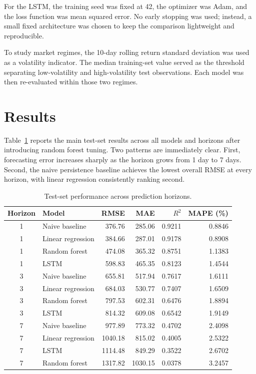 \documentclass[conference]{IEEEtran}
\begin{document}
For the LSTM, the training seed was fixed at 42, the optimizer was Adam, and the loss function was mean squared error. No early stopping was used; instead, a small fixed architecture was chosen to keep the comparison lightweight and reproducible.

To study market regimes, the 10-day rolling return standard deviation was used as a volatility indicator. The median training-set value served as the threshold separating low-volatility and high-volatility test observations. Each model was then re-evaluated within those two regimes.

\section{Results}
Table~\ref{tab:testmetrics} reports the main test-set results across all models and horizons after introducing random forest tuning. Two patterns are immediately clear. First, forecasting error increases sharply as the horizon grows from 1 day to 7 days. Second, the naive persistence baseline achieves the lowest overall RMSE at every horizon, with linear regression consistently ranking second.

\begin{table}[t]
\centering
\caption{Test-set performance across prediction horizons.}
\label{tab:testmetrics}
\scriptsize
\begin{tabular}{c l r r r r}
\toprule
Horizon & Model & RMSE & MAE & $R^2$ & MAPE (\%) \\
\midrule
1 & Naive baseline & 376.76 & 285.06 & 0.9211 & 0.8846 \\
1 & Linear regression & 384.66 & 287.01 & 0.9178 & 0.8908 \\
1 & Random forest & 474.08 & 365.32 & 0.8751 & 1.1383 \\
1 & LSTM & 598.83 & 465.35 & 0.8123 & 1.4544 \\
\midrule
3 & Naive baseline & 655.81 & 517.94 & 0.7617 & 1.6111 \\
3 & Linear regression & 684.03 & 530.77 & 0.7407 & 1.6509 \\
3 & Random forest & 797.53 & 602.31 & 0.6476 & 1.8894 \\
3 & LSTM & 814.32 & 609.08 & 0.6542 & 1.9149 \\
\midrule
7 & Naive baseline & 977.89 & 773.32 & 0.4702 & 2.4098 \\
7 & Linear regression & 1040.18 & 815.02 & 0.4005 & 2.5322 \\
7 & LSTM & 1114.48 & 849.29 & 0.3522 & 2.6702 \\
7 & Random forest & 1317.82 & 1030.15 & 0.0378 & 3.2457 \\
\bottomrule
\end{tabular}
\end{table}
\end{document}
